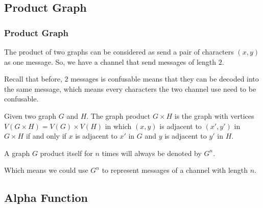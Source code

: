\documentclass{beamer}
\begin{document}
            \subsection{Product Graph}

                  \begin{frame}
                        \frametitle{Product Graph}
                        \begin{definition}\label{def:graphProduct}
                              The product of two graphs can be considered as send a pair of characters $(x,y)$ as one message. So, we have a channel that send messages of length $2$.

                              \pause

                              Recall that before, $2$ messages is confusable means that they can be decoded into the same message, which means every characters the two channel use need to be confusable.

                              Given two graph $ G $ and $ H $. The graph product $ G \times H $ is the graph with vertices $ V(G \times H) = V(G) \times V(H) $ in which $ (x,y) $ is adjacent to $ (x',y') $ in $ G \times H $ if and only if $ x $ is adjacent to $ x' $ in $ G $ and $ y $ is adjacent to $ y' $ in $ H $.
                  
                              \pause

                              A graph $ G $ product itself for $ n $ times will always be denoted by $ G^n $.

                              Which means we could use $ G^n $ to represent messages of a channel with length $n$.
                        \end{definition}
                  \end{frame}

            \subsection{Alpha Function}
\end{document}
